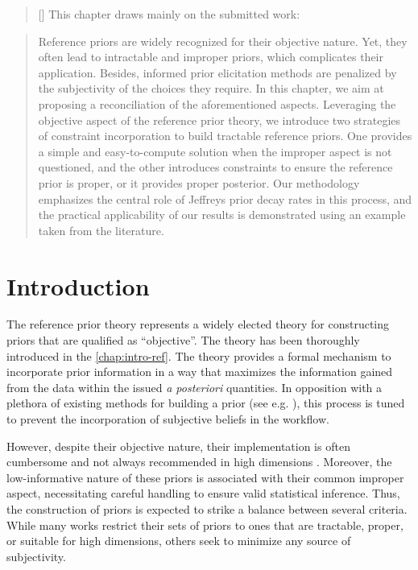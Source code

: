 

\begin{abstract}[\hspace*{-10pt}]
    This chapter draws mainly on the submitted work:   %
\end{abstract}

\begin{abstract}
    Reference priors are widely recognized for their objective nature. Yet, they often lead to intractable and improper priors, which complicates their application.
Besides, informed prior elicitation methods are penalized by the subjectivity of the choices they require. %
In this chapter, we aim at proposing a reconciliation of the aforementioned aspects. Leveraging the objective aspect of the reference prior theory, we introduce two strategies of constraint incorporation to build tractable reference priors.
One provides a simple and easy-to-compute solution when the improper aspect is not questioned, and the other introduces constraints to ensure the reference prior is proper, or it provides proper posterior.
Our methodology emphasizes the central role of Jeffreys prior decay rates in this process, and the practical applicability of our results is demonstrated using an example taken from the literature.
\end{abstract}

\minitoc



\section{Introduction}\label{sec:BA:intro}


The reference prior theory represents a widely elected theory for constructing priors that are qualified as ``objective''.
The theory has been thoroughly introduced in the \cref{chap:intro-ref}. %
The theory provides a formal mechanism to incorporate prior information in a way that maximizes the information gained from the data within the issued \emph{a posteriori} quantities.
In opposition with a plethora of existing  methods for building a prior (see e.g. \cite{mikkola_prior_2023}), 
this process is tuned to prevent the incorporation of subjective beliefs in the workflow.


However, despite their  objective nature,  their implementation is often cumbersome and not always recommended in high dimensions \citep{berger_overall_2015}. %
Moreover, the low-informative nature of these priors is associated with their common improper aspect, necessitating careful handling to ensure valid statistical inference.
Thus, the construction of priors is expected to strike a balance between several criteria. While many works restrict their sets of priors to ones that are tractable, proper, or suitable for high dimensions, others seek to minimize any source of subjectivity.

